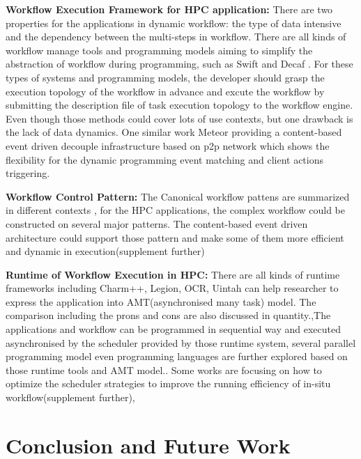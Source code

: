 \documentclass[10pt, conference, compsocconf]{IEEEtran}
\begin{document}
\textbf{Workflow Execution Framework for HPC application:}
There are two properties for the applications in dynamic workflow: the type of data intensive and the dependency between the multi-steps in workflow. There are all kinds of workflow manage tools and programming models aiming to simplify the abstraction of workflow during programming, such as Swift\cite{wilde2011swift} and Decaf \cite{dreher2017decaf} . For these types of systems and programming models, the developer should grasp the execution topology of the workflow in advance and excute the workflow by submitting the description file of task execution topology to the workflow engine. Even though those methods could cover lots of use contexts, but one drawback is the lack of data dynamics. One similar work Meteor\cite{jiang2008meteor} providing a content-based event driven decouple infrastructure based on p2p network which shows the flexibility for the dynamic programming event matching and client actions triggering. 

\textbf{Workflow Control Pattern:}
The Canonical workflow pattens are summarized in different contexts\cite{russell2006workflow} , for the HPC applications, the complex workflow could be constructed on several major patterns\cite{bharathi2008characterization}. The content-based event driven architecture could support those pattern and make some of them more efficient and dynamic in execution(supplement further)

\textbf{Runtime of Workflow Execution in HPC:}
There are all kinds of runtime frameworks including Charm++, Legion, OCR, Uintah can help researcher to express the application into AMT(asynchronised many task) model. The comparison including the prons and cons are also discussed in quantity.\cite{wilke2015asynchronousa,wilke2015asynchronousb},The applications and workflow can be programmed in sequential way and executed asynchronised by the scheduler provided by those runtime system, several parallel programming model even programming languages are further explored based on those runtime tools and AMT model.\cite{pebay2016towards,acun2014parallel,insituvisual}. Some works \cite{sun2016staging} are focusing on how to optimize the scheduler strategies to improve the running efficiency of in-situ workflow(supplement further), 


\section{Conclusion and Future Work}
\end{document}
